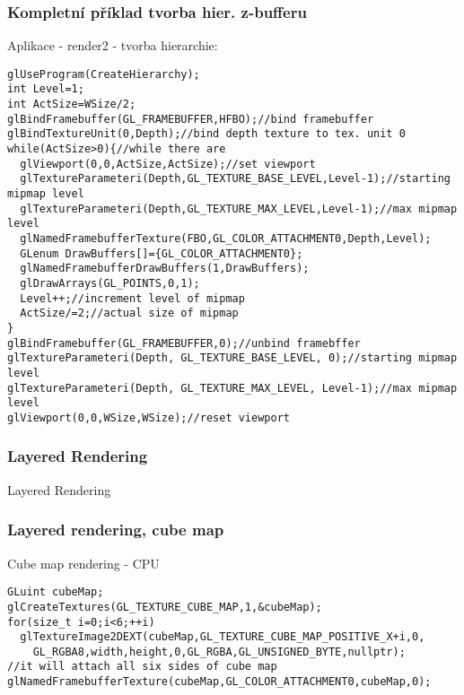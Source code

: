 \begin{frame}[fragile]
\frametitle{Kompletní příklad tvorba hier. z-bufferu}
		Aplikace - render2 - tvorba hierarchie:
{\scriptsize
\begin{verbatim}
glUseProgram(CreateHierarchy);
int Level=1;
int ActSize=WSize/2;
glBindFramebuffer(GL_FRAMEBUFFER,HFBO);//bind framebuffer
glBindTextureUnit(0,Depth);//bind depth texture to tex. unit 0
while(ActSize>0){//while there are
  glViewport(0,0,ActSize,ActSize);//set viewport
  glTextureParameteri(Depth,GL_TEXTURE_BASE_LEVEL,Level-1);//starting mipmap level
  glTextureParameteri(Depth,GL_TEXTURE_MAX_LEVEL,Level-1);//max mipmap level
  glNamedFramebufferTexture(FBO,GL_COLOR_ATTACHMENT0,Depth,Level);
  GLenum DrawBuffers[]={GL_COLOR_ATTACHMENT0};
  glNamedFramebufferDrawBuffers(1,DrawBuffers);
  glDrawArrays(GL_POINTS,0,1);
  Level++;//increment level of mipmap
  ActSize/=2;//actual size of mipmap
}
glBindFramebuffer(GL_FRAMEBUFFER,0);//unbind framebffer
glTextureParameteri(Depth, GL_TEXTURE_BASE_LEVEL, 0);//starting mipmap level
glTextureParameteri(Depth, GL_TEXTURE_MAX_LEVEL, Level-1);//max mipmap level
glViewport(0,0,WSize,WSize);//reset viewport
\end{verbatim}
}
\end{frame}


\begin{frame}
\frametitle{Layered Rendering}
\begin{center}
\Huge {\color{white}Layered Rendering}
\end{center}
\end{frame}

\begin{frame}[fragile]
\frametitle{Layered rendering, cube map}
Cube map rendering - CPU
{\scriptsize
\begin{verbatim}
GLuint cubeMap;
glCreateTextures(GL_TEXTURE_CUBE_MAP,1,&cubeMap);
for(size_t i=0;i<6;++i)
  glTextureImage2DEXT(cubeMap,GL_TEXTURE_CUBE_MAP_POSITIVE_X+i,0,
    GL_RGBA8,width,height,0,GL_RGBA,GL_UNSIGNED_BYTE,nullptr);
//it will attach all six sides of cube map
glNamedFramebufferTexture(cubeMap,GL_COLOR_ATTACHMENT0,cubeMap,0);
\end{verbatim}
}
\end{frame}

